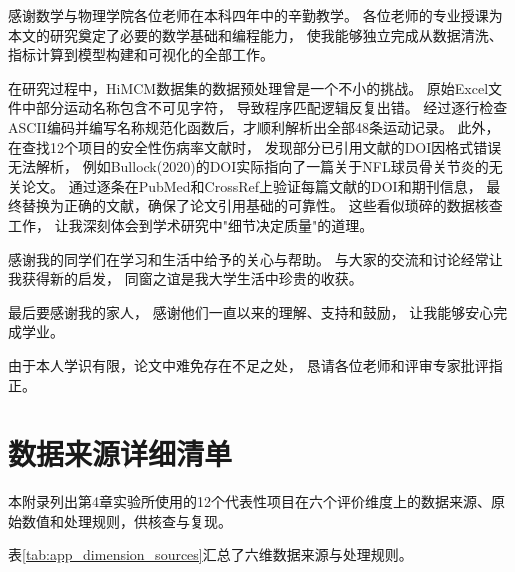 \documentclass[twoside]{CUGThesis}
\begin{document}
感谢数学与物理学院各位老师在本科四年中的辛勤教学。
各位老师的专业授课为本文的研究奠定了必要的数学基础和编程能力，
使我能够独立完成从数据清洗、指标计算到模型构建和可视化的全部工作。

在研究过程中，HiMCM数据集的数据预处理曾是一个不小的挑战。
原始Excel文件中部分运动名称包含不可见字符，
导致程序匹配逻辑反复出错。
经过逐行检查ASCII编码并编写名称规范化函数后，才顺利解析出全部48条运动记录。
此外，在查找12个项目的安全性伤病率文献时，
发现部分已引用文献的DOI因格式错误无法解析，
例如Bullock(2020)的DOI实际指向了一篇关于NFL球员骨关节炎的无关论文。
通过逐条在PubMed和CrossRef上验证每篇文献的DOI和期刊信息，
最终替换为正确的文献，确保了论文引用基础的可靠性。
这些看似琐碎的数据核查工作，
让我深刻体会到学术研究中"细节决定质量"的道理。

感谢我的同学们在学习和生活中给予的关心与帮助。
与大家的交流和讨论经常让我获得新的启发，
同窗之谊是我大学生活中珍贵的收获。

最后要感谢我的家人，
感谢他们一直以来的理解、支持和鼓励，
让我能够安心完成学业。

由于本人学识有限，论文中难免存在不足之处，
恳请各位老师和评审专家批评指正。

\clearpage


{}

\clearpage
\appendix
\section{数据来源详细清单}
\label{app:data_sources}

本附录列出第4章实验所使用的12个代表性项目在六个评价维度上的数据来源、原始数值和处理规则，供核查与复现。

表\ref{tab:app_dimension_sources}汇总了六维数据来源与处理规则。
\end{document}

